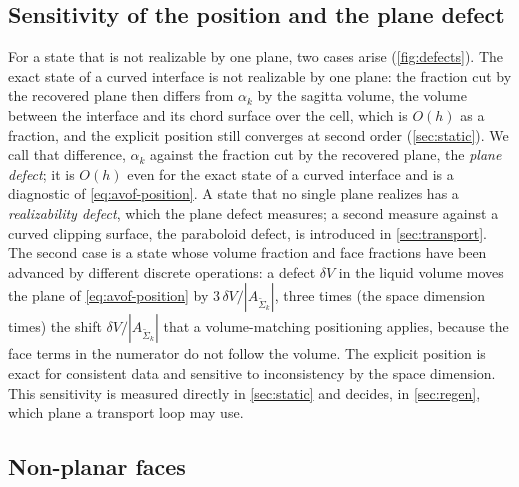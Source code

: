 \documentclass[preprint,12pt]{elsarticle}
\newcommand{\ASk}{A_{\tilde{\Sigma}_k}}
\begin{document}
\subsection{Sensitivity of the position and the plane defect}
\label{sec:defects}



For a state that is not realizable by one plane, two cases arise (\cref{fig:defects}). The exact state of a curved interface is not realizable by one plane: the fraction cut by the recovered plane then differs from $\alpha_k$ by the sagitta volume, the volume between the interface and its chord surface over the cell, which is $O(h)$ as a fraction, and the explicit position still converges at second order (\cref{sec:static}). We call that difference, $\alpha_k$ against the fraction cut by the recovered plane, the \emph{plane defect}; it is $O(h)$ even for the exact state of a curved interface and is a diagnostic of \cref{eq:avof-position}. A state that no single plane realizes has a \emph{realizability defect}, which the plane defect measures; a second measure against a curved clipping surface, the paraboloid defect, is introduced in \cref{sec:transport}. The second case is a state whose volume fraction and face fractions have been advanced by different discrete operations: a defect $\delta V$ in the liquid volume moves the plane of \cref{eq:avof-position} by $3\,\delta V/|\ASk|$, three times (the space dimension times) the shift $\delta V/|\ASk|$ that a volume-matching positioning applies, because the face terms in the numerator do not follow the volume. The explicit position is exact for consistent data and sensitive to inconsistency by the space dimension. This sensitivity is measured directly in \cref{sec:static} and decides, in \cref{sec:regen}, which plane a transport loop may use.

\subsection{Non-planar faces}
\label{sec:warped}
\end{document}
